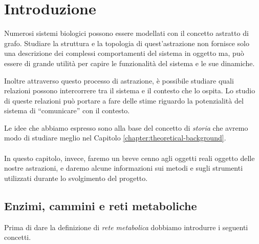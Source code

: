\chapter{Introduzione}
\label{chapter:introduction}

Numerosi sistemi biologici possono essere modellati con il concetto
astratto di grafo. Studiare la struttura e la topologia di
quest'astrazione non fornisce solo una descrizione dei complessi
comportamenti del sistema in oggetto ma, pu\`o essere di grande
utilit\`a per capire le funzionalit\`a del sistema e le sue dinamiche.

Inoltre attraverso questo processo di astrazione, \`e possibile
studiare quali relazioni possono intercorrere tra il sistema e il
contesto che lo ospita. Lo studio di queste relazioni pu\`o portare a
fare delle stime riguardo la potenzialit\`a del sistema di
``comunicare'' con il contesto.

Le idee che abbiamo espresso sono alla base del concetto di
\emph{storia} che avremo modo di studiare meglio nel Capitolo
\ref{chapter:theoretical-background}.  
\\\\
In questo capitolo, invece, faremo un breve cenno agli oggetti reali
oggetto delle nostre astrazioni, e daremo alcune informazioni sui
metodi e sugli strumenti utilizzati durante lo svolgimento del
progetto.

\section{Enzimi, cammini e reti metaboliche}

Prima di dare la definizione di \emph{rete metabolica} dobbiamo
introdurre i seguenti concetti.

